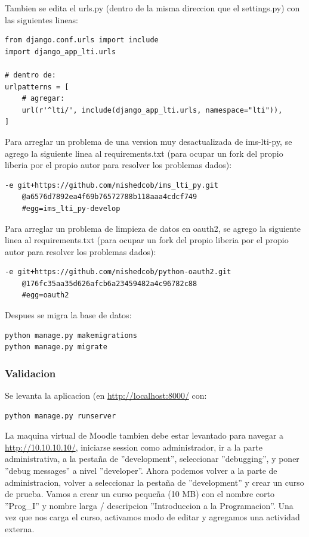 Tambien se edita el urls.py (dentro de la misma direccion que el settings.py) con las siguientes lineas:
\begin{lstlisting}
from django.conf.urls import include
import django_app_lti.urls

# dentro de:
urlpatterns = [
    # agregar:
    url(r'^lti/', include(django_app_lti.urls, namespace="lti")),
]

\end{lstlisting}

\lstset{language=Bash}

Para arreglar un problema de una version muy desactualizada de ims-lti-py, se agrego la siguiente linea al requirements.txt (para ocupar un fork del propio liberia por el propio autor para resolver los problemas dados):
\begin{lstlisting}
-e git+https://github.com/nishedcob/ims_lti_py.git
	@a6576d7892ea4f69b76572788b118aaa4cdcf749
	#egg=ims_lti_py-develop
\end{lstlisting}

Para arreglar un problema de limpieza de datos en oauth2, se agrego la siguiente linea al requirements.txt (para ocupar un fork del propio liberia por el propio autor para resolver los problemas dados):
\begin{lstlisting}
-e git+https://github.com/nishedcob/python-oauth2.git
	@176fc35aa35d626afcb6a23459482a4c96782c88
	#egg=oauth2
\end{lstlisting}

Despues se migra la base de datos:
\begin{lstlisting}
python manage.py makemigrations
python manage.py migrate
\end{lstlisting}

\subsubsection{Validacion}

Se levanta la aplicacion (en \url{http://localhost:8000/} con:
\begin{lstlisting}
python manage.py runserver
\end{lstlisting}
La maquina virtual de Moodle tambien debe estar levantado para navegar a \url{http://10.10.10.10/}, iniciarse session como administrador, ir a la parte administrativa, a la pestaña de ''development'', seleccionar ''debugging'', y poner ''debug messages'' a nivel ''developer''. Ahora podemos volver a la parte de administracion, volver a seleccionar la pestaña de ''development'' y crear un curso de prueba. Vamos a crear un curso pequeña (10 MB) con el nombre corto ''Prog\_I'' y nombre larga / descripcion ''Introduccion a la Programacion''. Una vez que nos carga el curso, activamos modo de editar y agregamos una actividad externa.


